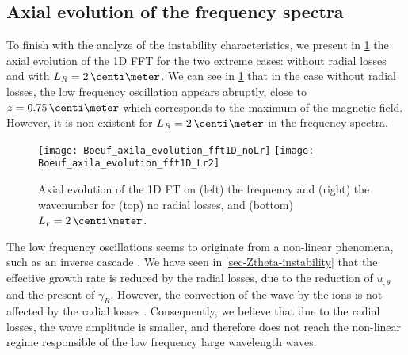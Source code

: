   \subsection{Axial evolution of the frequency spectra} \label{subsec-axialFFT}
  
  To finish with the analyze of the instability characteristics, we present in \cref{fig-axial_fft1D} the axial evolution of the \ac{1D} \ac{FFT} for the two extreme cases\string: without radial losses and with $L_R=2\,\centi\meter$.
  We can see in \cref{fig-axial_fft1D} that in the case without radial losses, the low frequency oscillation appears abruptly, close to $z=0.75\,\centi\meter$ which corresponds to the maximum of the magnetic field.
  However, it is non-existent for $L_R=2\,\centi\meter$ in the frequency spectra.
  
 \begin{figure}[!hbt]
   \centering
   \texttt{[image: Boeuf\_axila\_evolution\_fft1D\_noLr]}
   \texttt{[image: Boeuf\_axila\_evolution\_fft1D\_Lr2]}
   \caption{Axial evolution of the \acs{1D} \acs{FT} on (left) the frequency and (right) the wavenumber for (top) no radial losses, and (bottom) $L_r=2\,\centi\meter$. }
   \label{fig-axial_fft1D}
 \end{figure}
  
  The low frequency oscillations seems to originate from a non-linear phenomena, such as an inverse cascade \citep{taccogna2019}.
  We have seen in \cref{sec-Ztheta-instability} that the effective growth rate is reduced by the radial losses, due to the reduction of $u_{, \theta}$ and the present of $\gamma_R$.
  However, the convection of the wave by the ions is not affected by the radial losses \citep{martorelli2019}.
  Consequently, we believe that due to the radial losses, the wave amplitude is smaller, and therefore does not reach the non-linear regime responsible of the low frequency large wavelength waves.


